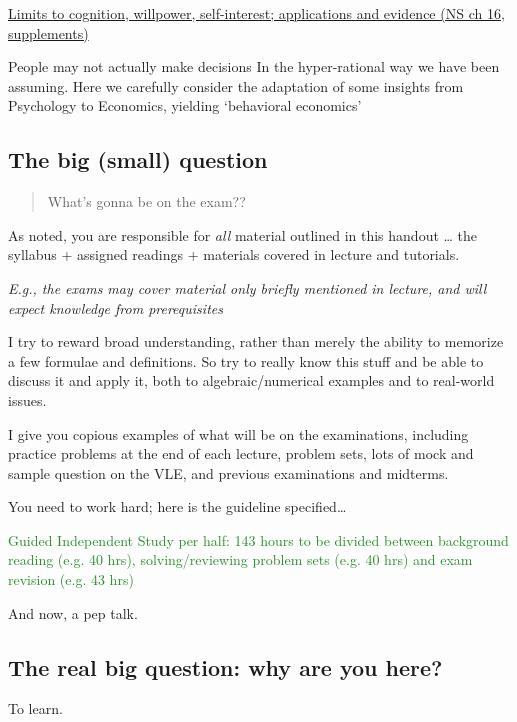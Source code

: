 \documentclass[]{article}
\begin{document}
\underline{Limits to cognition, willpower, self-interest; applications and evidence (NS ch 16, supplements)}

People may not actually make decisions In the hyper-rational way we have been assuming. Here we carefully consider the adaptation of some insights from Psychology to Economics, yielding `behavioral economics'

\hypertarget{the-big-small-question}{%
\subsection{The big (small) question}\label{the-big-small-question}}

\begin{quote}
What's gonna be on the exam??
\end{quote}

As noted, you are responsible for \emph{all} material outlined in this handout \ldots{} the syllabus + assigned readings + materials covered in lecture and tutorials.

\emph{E.g., the exams may cover material only briefly mentioned in lecture, and will expect knowledge from prerequisites}

I try to reward broad understanding, rather than merely the ability to memorize a few formulae and definitions. So try to really know this stuff and be able to discuss it and apply it, both to algebraic/numerical examples and to real-world issues.

I give you copious examples of what will be on the examinations, including practice problems at the end of each lecture, problem sets, lots of mock and sample question on the VLE, and previous examinations and midterms.

You need to work hard; here is the guideline specified\ldots{}

\textcolor{ForestGreen}{\small{Guided Independent Study per half: 143 hours to be divided between background reading (e.g. 40 hrs), solving/reviewing problem sets (e.g. 40 hrs) and exam revision (e.g. 43 hrs)}}

And now, a pep talk.

\hypertarget{the-real-big-question-why-are-you-here}{%
\subsection{The real big question: why are you here?}\label{the-real-big-question-why-are-you-here}}

To learn.
\end{document}
